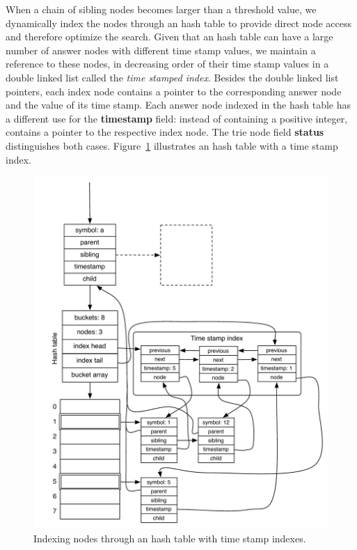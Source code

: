When a chain of sibling nodes becomes larger than a threshold value, we dynamically index the
nodes through an hash table to provide direct node access and therefore optimize the search. Given
that an hash table can have a large number of answer nodes with different time stamp values, we maintain
a reference to these nodes, in decreasing order of their time stamp values in a double linked list
called the \textit{time stamped index}.
Besides the double linked list pointers, each index node contains a pointer to the corresponding
answer node and the value of its time stamp. Each answer node indexed in the hash table has a different use
for the \textbf{timestamp} field: instead of containing a positive integer, contains a pointer
to the respective index node. The trie node field \textbf{status} distinguishes
both cases. Figure~\ref{fig:hash_table_tst} illustrates an hash table with a time stamp index.

\begin{figure}[ht]
  \centering
    \includegraphics[scale=0.6]{hash_table_tst.pdf}
  \caption{Indexing nodes through an hash table with time stamp indexes.}
  \label{fig:hash_table_tst}
\end{figure}

